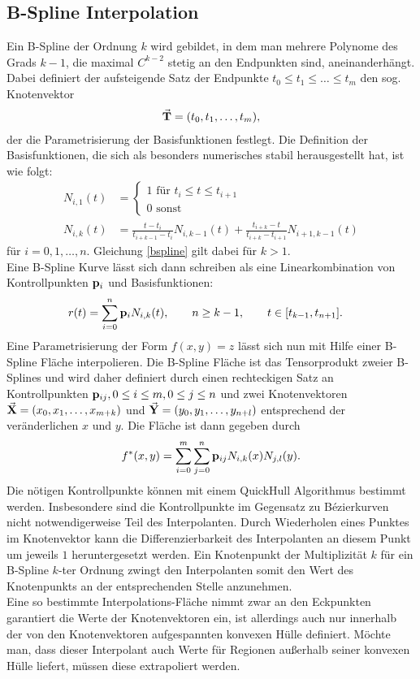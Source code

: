 \subsection{B-Spline Interpolation}
Ein B-Spline der Ordnung $k$ wird gebildet, in dem man mehrere Polynome des Grads $k-1$, die maximal $C^{k-2}$ stetig an den Endpunkten sind, aneinanderhängt. Dabei definiert der aufsteigende Satz der Endpunkte $t_0 \le t_1 \le \ldots \le t_m$ den sog. Knotenvektor
\begin{align*}
	\va{T} = (t_0,t_1,\ldots,t_m),
\end{align*}
der die Parametrisierung der Basisfunktionen festlegt. Die Definition der Basisfunktionen, die sich als besonders numerisches stabil herausgestellt hat, ist wie folgt\cite{b-splines}:
\begin{align}
	N_{i,1}(t) &= \begin{cases}1 \text{ für } t_i \le t \le t_{i+1}\\0\text{ sonst}\end{cases}\\
    N_{i,k}(t) &= \frac{t-t_i}{t_{i+k-1}-t_i}N_{i,k-1}(t)+\frac{t_{i+k}-t}{t_{i+k}-t_{i+1}}N_{i+1,k-1}(t)\label{bspline}
\end{align}
für $i=0,1,\ldots,n$. Gleichung \eqref{bspline} gilt dabei für $k > 1$.\\
Eine B-Spline Kurve lässt sich dann schreiben als eine Linearkombination von Kontrollpunkten $\vb{p}_i$ und Basisfunktionen:
\begin{align}
	r(t) &= \sum_{i=0}^n\vb{p}_i N_{i,k}(t),\qquad n\ge k-1,\qquad t\in [t_{k-1},t_{n+1}].
\end{align}
Eine Parametrisierung der Form $f(x, y)=z$ lässt sich nun mit Hilfe einer B-Spline Fläche interpolieren. Die B-Spline Fläche ist das Tensorprodukt zweier B-Splines und wird daher definiert durch einen rechteckigen Satz an Kontrollpunkten $\vb{p}_{ij},0\le i\le m, 0\le j \le n$ und zwei Knotenvektoren $\va{X} = (x_0,x_1,\ldots,x_{m+k})$ und $\va{Y} = (y_0,y_1,\ldots,y_{n+l})$ entsprechend der veränderlichen $x$ und $y$.
Die Fläche ist dann gegeben durch
\begin{align}
	f^*(x, y) = \sum_{i=0}^m\sum_{j=0}^n \vb{p}_{ij} N_{i,k}(x)N_{j,l}(y).
\end{align}
Die nötigen Kontrollpunkte können mit einem QuickHull Algorithmus bestimmt werden\cite{surface}. Insbesondere sind die Kontrollpunkte im Gegensatz zu Bézierkurven nicht notwendigerweise Teil des Interpolanten. Durch Wiederholen eines Punktes im Knotenvektor kann die Differenzierbarkeit des Interpolanten an diesem Punkt um jeweils $1$ heruntergesetzt werden. Ein Knotenpunkt der Multiplizität $k$ für ein B-Spline $k$-ter Ordnung zwingt den Interpolanten somit den Wert des Knotenpunkts an der entsprechenden Stelle anzunehmen.\\
Eine so bestimmte Interpolations-Fläche nimmt zwar an den Eckpunkten garantiert die Werte der Knotenvektoren ein, ist allerdings auch nur innerhalb der von den Knotenvektoren aufgespannten konvexen Hülle definiert. Möchte man, dass dieser Interpolant auch Werte für Regionen außerhalb seiner konvexen Hülle liefert, müssen diese extrapoliert werden.
